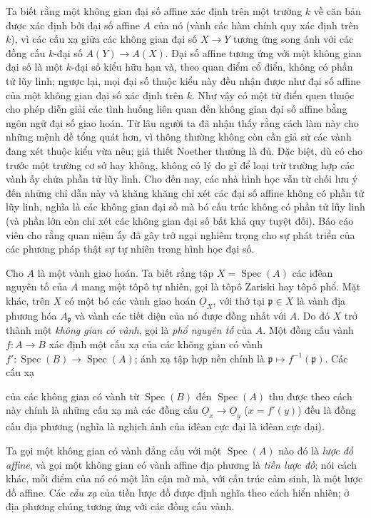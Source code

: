 \documentclass[11pt,twoside,openany]{book}
\numberwithin{equation}{section}
\newcommand{\src}[1]{%
  \phantomsection\hypertarget{src:\fgasourceid:#1}{}%
  \marginpar{\raggedleft\footnotesize\sffamily #1}%
}
\newcommand{\fgasourceid}{unset}
\newcommand{\Osh}{\underline{O}}
\newcommand{\fquote}[1]{\textquotedbl#1\textquotedbl}
\begin{document}
Ta biết rằng một không gian đại số affine xác định trên một trường $k$ về căn
bản được xác định bởi đại số affine $A$ của nó (vành các hàm chính quy xác định
trên $k$), vì các cấu xạ giữa các không gian đại số
$X\longrightarrow Y$ tương ứng song ánh với các đồng cấu
$k$-đại số $A(Y)\longrightarrow A(X)$. Đại số affine tương ứng với một không
gian đại số là một $k$-đại số kiểu hữu hạn và, theo quan điểm
\fquote{cổ điển}, không có phần tử lũy linh; ngược lại, mọi đại số thuộc kiểu
này đều nhận được như đại số affine của một không gian đại số xác định trên
$k$. Như vậy có một từ điển quen thuộc cho phép diễn giải các tình huống liên
quan đến không gian đại số affine bằng ngôn ngữ đại số giao hoán. Từ lâu người
ta đã nhận thấy rằng cách làm này cho những mệnh đề tổng quát hơn, vì thông
thường không còn cần giả sử các vành đang xét thuộc kiểu vừa nêu; giả thiết
Noether thường là đủ. Đặc biệt, dù có cho trước một trường cơ sở hay không,
không có lý do gì để loại trừ trường hợp các vành ấy chứa phần tử lũy linh.
Cho đến nay, các nhà hình học vẫn từ chối lưu ý đến những chỉ dẫn này và khăng
khăng chỉ xét các đại số affine không có phần tử lũy linh, nghĩa là các không
gian đại số mà bó cấu trúc không có phần tử lũy linh (và phần lớn còn chỉ xét
các không gian đại số \fquote{bất khả quy tuyệt đối}). Báo cáo viên cho rằng
quan niệm ấy đã gây trở ngại nghiêm trọng cho sự phát triển của các phương
pháp thật sự tự nhiên trong hình học đại số.

Cho $A$ là một vành giao hoán. Ta biết rằng tập
$X=\operatorname{Spec}(A)$ các iđêan nguyên tố của $A$ mang một tôpô tự nhiên,
gọi là \fquote{tôpô Zariski} hay tôpô phổ. Mặt khác, trên $X$ có một bó các
vành giao hoán $\Osh_X$, với thớ tại $\mathfrak p\in X$ là vành địa phương hóa
$A_{\mathfrak p}$ và vành các tiết diện của nó được đồng nhất với $A$. Do đó
$X$ trở thành một \emph{không gian có vành}, gọi là \emph{phổ nguyên tố} của
$A$. Một đồng cấu vành $f:A\longrightarrow B$ xác định một cấu xạ của các
không gian có vành
$f':\operatorname{Spec}(B)\longrightarrow\operatorname{Spec}(A)$; ánh xạ tập
hợp nền chính là $\mathfrak p\longmapsto f^{-1}(\mathfrak p)$. Các cấu xạ

\src{194}
của các không gian có vành từ $\operatorname{Spec}(B)$ đến
$\operatorname{Spec}(A)$ thu được theo cách này chính là những cấu xạ mà các
đồng cấu $\Osh_x\longrightarrow\Osh_y$ ($x=f'(y)$) đều là đồng cấu địa phương
(nghĩa là nghịch ảnh của iđêan cực đại là iđêan cực đại).

Ta gọi một không gian có vành đẳng cấu với một
$\operatorname{Spec}(A)$ nào đó là \emph{lược đồ affine}, và gọi một không gian
có vành affine địa phương là \emph{tiền lược đồ}; nói cách khác, mỗi điểm của
nó có một lân cận mở mà, với cấu trúc cảm sinh, là một lược đồ affine. Các
\emph{cấu xạ} của tiền lược đồ được định nghĩa theo cách hiển nhiên; ở địa
phương chúng tương ứng với các đồng cấu vành.
\end{document}
